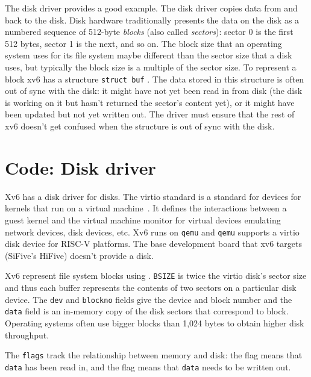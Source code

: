 The disk driver provides a good example.  The disk driver copies data
from and back to the disk.  Disk hardware traditionally presents the data on the
disk as a numbered sequence of 512-byte 
\textit{blocks} 
(also called 
\textit{sectors}): 
sector 0 is the first 512 bytes, sector 1 is the next, and so on. The block size
that an operating system uses for its file system maybe different than the
sector size that a disk uses, but typically the block size is a multiple of the
sector size. To
represent a block xv6 has a structure
\lstinline{struct buf}
.
The
data stored in this structure is often out of sync with the disk: it might have
not yet been read in from disk (the disk is working on it but hasn't returned
the sector's content yet), or it might have been updated but not yet written
out.  The driver must ensure that the rest of xv6 doesn't get confused when the
structure is out of sync with the disk.

\section{Code: Disk driver}

Xv6 has a disk driver for  disks. The
virtio standard is a standard for devices for kernels that run on a
virtual machine~\cite{virtio}.  It defines the interactions between a guest kernel
and the virtual machine monitor for virtual devices emulating network
devices, disk devices, etc.  Xv6 runs on \texttt{qemu} and
\texttt{qemu} supports a virtio disk device for RISC-V platforms.  The
base development board that xv6 targets (SiFive's HiFive) doesn't
provide a disk.

Xv6 represent file system blocks using
.
\lstinline{BSIZE}
is twice the virtio disk's sector size and thus
each buffer represents the contents of two sectors on a particular
disk device.  The
\lstinline{dev}
and
\lstinline{blockno}
fields give the device and block
number and the
\lstinline{data}
field is an in-memory copy of the disk sectors that correspond to block.
Operating systems often use
bigger blocks than 1,024 bytes to obtain higher disk throughput.

The
\lstinline{flags}
track the relationship between memory and disk:
the
flag means that
\lstinline{data}
has been read in, and
the 
flag means that
\lstinline{data}
needs to be written out.

